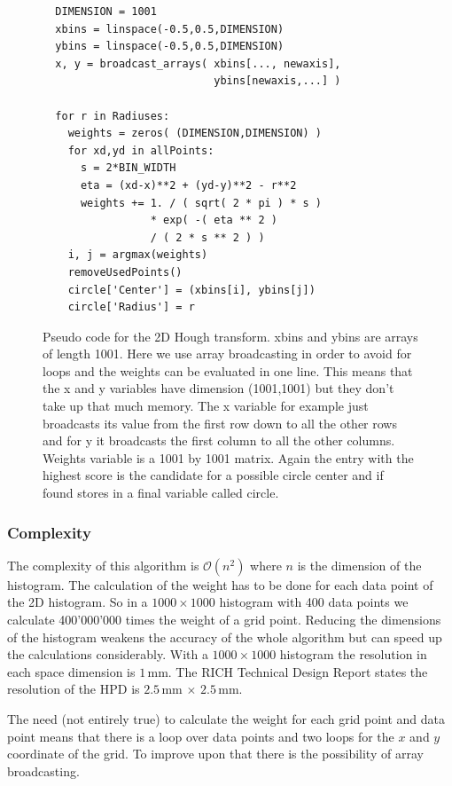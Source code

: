 \documentclass[11pt,twoside]{scrreprt}
\begin{document}
\begin{figure}[b]
\begin{lstlisting}
  DIMENSION = 1001
  xbins = linspace(-0.5,0.5,DIMENSION)
  ybins = linspace(-0.5,0.5,DIMENSION)
  x, y = broadcast_arrays( xbins[..., newaxis], 
                           ybins[newaxis,...] )

  for r in Radiuses:
    weights = zeros( (DIMENSION,DIMENSION) )
    for xd,yd in allPoints:
      s = 2*BIN_WIDTH
      eta = (xd-x)**2 + (yd-y)**2 - r**2      
      weights += 1. / ( sqrt( 2 * pi ) * s ) 
                 * exp( -( eta ** 2 ) 
                 / ( 2 * s ** 2 ) )
    i, j = argmax(weights)
    removeUsedPoints()
    circle['Center'] = (xbins[i], ybins[j])
    circle['Radius'] = r
\end{lstlisting}
  \caption[Pseudo code 2D HT]{Pseudo code for the 2D Hough transform. xbins and ybins are arrays of length 1001. Here we use array broadcasting in order to avoid for loops and the weights can be evaluated in one line. This means that the x and y variables have dimension (1001,1001) but they don't take up that much memory. The x variable for example just broadcasts its value from the first row down to all the other rows and for y it broadcasts the first column to all the other columns. Weights variable is a 1001 by 1001 matrix. Again the entry with the highest score is the candidate for a possible circle center and if found stores in a final variable called circle.}
\end{figure}


\subsubsection{Complexity} %
\label{ssub:complexity_2d}
The complexity of this algorithm is $\mathcal{O}(n^2)$ where $n$ is the dimension of the histogram. The calculation of the weight has to be done for each data point of the 2D histogram. So in a $1000\times 1000$ histogram with 400 data points we calculate 400'000'000 times the weight of a grid point. Reducing the dimensions of the histogram weakens the accuracy of the whole algorithm but can speed up the calculations considerably. With a $1000\times 1000$ histogram the resolution in each space dimension is $1$\,mm. The RICH Technical Design Report states the resolution of the HPD is $2.5$\,mm $\times$ $2.5$\,mm.

The need (not entirely true) to calculate the weight for each grid point and data point means that there is a loop over data points and two loops for the $x$ and $y$ coordinate of the grid. To improve upon that there is the possibility of array broadcasting.
\end{document}
